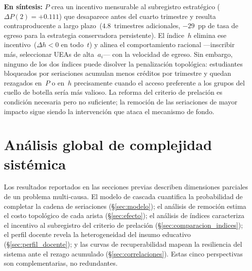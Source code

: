 \documentclass[11pt,letterpaper]{article}
\begin{document}
\textbf{En síntesis:} $P$ crea un incentivo mensurable al subregistro estratégico
($\Delta P(2)=+0.111$) que desaparece antes del cuarto trimestre y resulta
contraproducente a largo plazo~($4.8$~trimestres adicionales, $-29$~pp de
tasa de egreso para la estrategia conservadora persistente).
El índice~$h$ elimina ese incentivo~($\Delta h<0$ en todo~$t$) y alinea el
comportamiento racional ---inscribir más, seleccionar UEAs de alta~$a_i$--- con
la velocidad de egreso.
Sin embargo, ninguno de los dos índices puede disolver la penalización topológica:
estudiantes bloqueados por seriaciones acumulan menos créditos por trimestre y
quedan rezagados en~$P$ o en~$h$ precisamente cuando el acceso preferente a los
grupos del cuello de botella sería más valioso.
La reforma del criterio de prelación es condición necesaria pero no suficiente;
la remoción de las seriaciones de mayor impacto sigue siendo la intervención que
ataca el mecanismo de fondo.

\section{Análisis global de complejidad sistémica}
\label{sec:complejidad}

Los resultados reportados en las secciones previas describen dimensiones parciales de un problema multi-causa.
El modelo de cascada cuantifica la probabilidad de completar la cadena de seriaciones
(\S\ref{sec:modelo}); el análisis de remoción estima el costo topológico de cada arista
(\S\ref{sec:efecto}); el análisis de índices caracteriza el incentivo al subregistro del criterio de
prelación (\S\ref{sec:comparacion_indices}); el perfil docente revela la heterogeneidad del insumo
educativo (\S\ref{sec:perfil_docente}); y las curvas de recuperabilidad mapean la resiliencia del
sistema ante el rezago acumulado (\S\ref{sec:correlaciones}).
Estas cinco perspectivas son complementarias, no redundantes.
\end{document}

